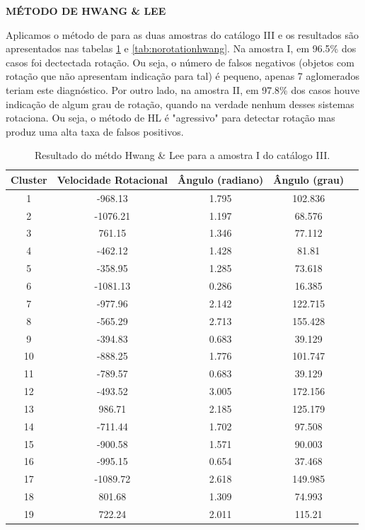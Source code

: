 \textbf{MÉTODO DE HWANG \& LEE}

Aplicamos o método de  para as duas amostras do catálogo III  e os resultados são apresentados nas tabelas \ref{tab:rotationhwang} e \ref{tab:norotationhwang}. Na amostra I, em 96.5\% dos casos foi dectectada rotação. Ou seja, o número
de falsos negativos (objetos com rotação que não apresentam indicação para tal) é pequeno, apenas 7 aglomerados teriam 
este diagnóstico. Por outro lado,
na amostra II, em 97.8\% dos casos houve indicação de algum grau de rotação, quando na verdade nenhum desses
sistemas rotaciona. Ou seja, o método de HL é "agressivo" para detectar rotação mas produz uma alta 
taxa de falsos positivos.

{\small 
\begin{longtable}{ccccc}
\caption{Resultado do métdo Hwang \& Lee para a amostra I do catálogo III.}\label{tab:rotationhwang}
\\ \hline
\multicolumn{1}{l}{\textbf{Cluster}} & \multicolumn{1}{l}{\textbf{Velocidade Rotacional}} & \multicolumn{1}{l}{\textbf{Ângulo (radiano)}} & \multicolumn{1}{l}{\textbf{Ângulo (grau)}} \\ \hline
1 & -968.13 & 1.795 & 102.836 \\
2 & -1076.21 & 1.197 & 68.576 \\
3 & 761.15 & 1.346 & 77.112 \\
4 & -462.12 & 1.428 & 81.81 \\
5 & -358.95 & 1.285 & 73.618 \\
6 & -1081.13 & 0.286 & 16.385 \\
7 & -977.96 & 2.142 & 122.715 \\
8 & -565.29 & 2.713 & 155.428 \\
9 & -394.83 & 0.683 & 39.129 \\
10 & -888.25 & 1.776 & 101.747 \\
11 & -789.57 & 0.683 & 39.129 \\
12 & -493.52 & 3.005 & 172.156 \\
13 & 986.71 & 2.185 & 125.179 \\
14 & -711.44 & 1.702 & 97.508 \\
15 & -900.58 & 1.571 & 90.003 \\
16 & -995.15 & 0.654 & 37.468 \\
17 & -1089.72 & 2.618 & 149.985 \\
18 & 801.68 & 1.309 & 74.993 \\
19 & 722.24 & 2.011 & 115.21 \\

\end{longtable}}
